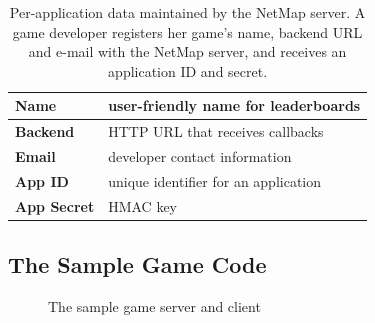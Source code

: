 \begin{table}[hbtp]
\begin{tabular}{|p{2.00cm}|p{5.50cm}|}
\hline
\textbf{Name} & user-friendly name for leaderboards \\
\hline
\textbf{Backend} & HTTP URL that receives callbacks \\
\hline
\textbf{Email} & developer contact information \\
\hline
\hline
\textbf{App ID} & unique identifier for an application \\
\hline
\textbf{App Secret} & HMAC key \\
\hline
\end{tabular}
\caption{
  Per-application data maintained by the NetMap server. A game developer
  registers her game's name, backend URL and e-mail with the NetMap server, and
  receives an application ID and secret.
}
\label{table:metrics-app}
\end{table}

\subsection{The Sample Game Code}

\begin{figure}[hbtp]
  \caption{
    The sample game server and client
  }
  \label{fig:sample}
\end{figure}

